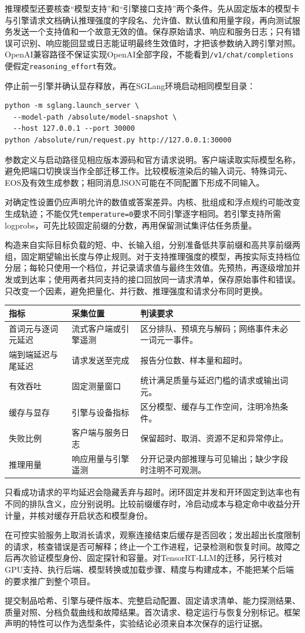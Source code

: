 推理模型还要核查“模型支持”和“引擎接口支持”两个条件。先从固定版本的模型卡与引擎请求文档确认推理强度的字段名、允许值、默认值和用量字段，再向测试服务发送一个支持值和一个故意无效的值。保存原始请求、响应和服务日志；只有错误可识别、响应能回显或日志能证明最终生效值时，才把该参数纳入跨引擎对照。OpenAI兼容路径不保证实现OpenAI全部字段，不能看到\texttt{/v1/chat/completions}便假定\texttt{reasoning\_effort}有效。

停止前一引擎并确认显存释放，再在SGLang环境启动相同模型目录：
\begin{verbatim}
python -m sglang.launch_server \
  --model-path /absolute/model-snapshot \
  --host 127.0.0.1 --port 30000
python /absolute/run/request.py http://127.0.0.1:30000
\end{verbatim}
参数定义与启动路径见相应版本源码和官方请求说明\cite{sglang2026serverargs,sglang2026requests}。客户端读取实际模型名称，避免把端口切换误当作全部迁移工作。比较模板渲染后的输入词元、特殊词元、EOS及有效生成参数；相同消息JSON可能在不同配置下形成不同输入。

对确定性设置仍应声明允许的数值或答案差异。内核、批组成和浮点规约可能改变生成轨迹；不能仅凭\texttt{temperature=0}要求不同引擎逐字相同。若引擎支持所需logprobs，可先比较固定前缀的分数，再用保留测试集评估任务质量。

构造来自实际目标负载的短、中、长输入组，分别准备低共享前缀和高共享前缀两组，固定期望输出长度与停止规则。对于支持推理强度的模型，再按实际支持档位分层；每轮只使用一个档位，并记录请求值与最终生效值。先预热，再逐级增加并发或到达率；使用两者共同支持的接口回放同一请求清单，保存原始事件和错误。只改变一个因素，避免把量化、并行数、推理强度和请求分布同时更换。

\begin{center}
\begin{tabularx}{\linewidth}{p{29mm}XX}
\toprule 指标 & 采集位置 & 判读要求\\\midrule
首词元与逐词元延迟 & 流式客户端或引擎遥测 & 区分排队、预填充与解码；网络事件未必一词元一事件。\\
端到端延迟与尾延迟 & 请求发送至完成 & 报告分位数、样本量和超时。\\
有效吞吐 & 固定测量窗口 & 统计满足质量与延迟门槛的请求或输出词元。\\
缓存与显存 & 引擎与设备指标 & 区分模型、缓存与工作空间，注明冷热条件。\\
失败比例 & 客户端与服务日志 & 保留超时、取消、资源不足和异常停止。\\
推理用量 & 响应用量与引擎遥测 & 分开记录内部推理与可见输出；缺少字段时注明不可观测。\\
\bottomrule
\end{tabularx}
\end{center}
只看成功请求的平均延迟会隐藏丢弃与超时。闭环固定并发和开环固定到达率也有不同的排队含义，应分别说明。比较前缀缓存时，冷启动成本与稳定命中收益分开计量，并核对缓存开启状态和模型身份。

在可控实验服务上取消长请求，观察连接结束后缓存是否回收；发出超出长度限制的请求，核查错误是否可解释；终止一个工作进程，记录检测和恢复时间。故障之后再次验证模型身份、固定探针和容量。对TensorRT-LLM的迁移，另行核对GPU支持、执行后端、模型转换或加载步骤、精度与构建成本，不能把某个后端的要求推广到整个项目。

提交制品哈希、引擎与硬件版本、完整启动配置、固定请求清单、能力探测结果、质量对照、分档负载曲线和故障结果。首次请求、稳定运行与恢复分别标记。框架声明的特性可以作为选型条件，实验结论必须来自本次保存的运行证据。
